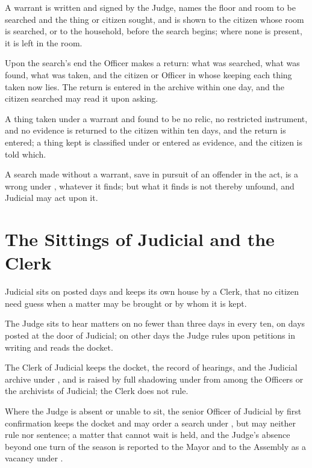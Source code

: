 \begin{clauses}
\item A warrant is written and signed by the Judge, names the floor and room to be searched and the thing or citizen sought, and is shown to the citizen whose room is searched, or to the household, before the search begins; where none is present, it is left in the room.
\item Upon the search's end the Officer makes a return: what was searched, what was found, what was taken, and the citizen or Officer in whose keeping each thing taken now lies. The return is entered in the archive within one day, and the citizen searched may read it upon asking.
\item A thing taken under a warrant and found to be no relic, no restricted instrument, and no evidence is returned to the citizen within ten days, and the return is entered; a thing kept is classified under  or entered as evidence, and the citizen is told which.
\item A search made without a warrant, save in pursuit of an offender in the act, is a wrong under , whatever it finds; but what it finds is not thereby unfound, and Judicial may act upon it.
\end{clauses}

\section{The Sittings of Judicial and the Clerk}
\label{sec:judicial:sittings-of-judicial-and-the-clerk}

Judicial sits on posted days and keeps its own house by a Clerk, that no citizen need guess when a matter may be brought or by whom it is kept.

\begin{clauses}
\item The Judge sits to hear matters on no fewer than three days in every ten, on days posted at the door of Judicial; on other days the Judge rules upon petitions in writing and reads the docket.
\item The Clerk of Judicial keeps the docket, the record of hearings, and the Judicial archive under , and is raised by full shadowing under  from among the Officers or the archivists of Judicial; the Clerk does not rule.
\item Where the Judge is absent or unable to sit, the senior Officer of Judicial by first confirmation keeps the docket and may order a search under , but may neither rule nor sentence; a matter that cannot wait is held, and the Judge's absence beyond one turn of the season is reported to the Mayor and to the Assembly as a vacancy under .
\end{clauses}

